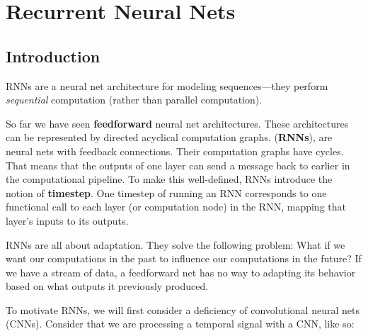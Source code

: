 
\chapter{Recurrent Neural Nets}
\label{chapter:recurrent_neural_nets}

\section{Introduction}
RNNs are a neural net architecture for modeling sequences—they perform \textit{sequential} computation (rather than parallel computation). 

So far we have seen {\bf feedforward} neural net architectures. These architectures can be represented by directed acyclical computation graphs.  ({\bf RNNs}), are neural nets with feedback connections. Their computation graphs have cycles. That means that the outputs of one layer can send a message back to earlier in the computational pipeline. To make this well-defined, RNNs introduce the notion of \textbf{timestep}. One timestep of running an RNN corresponds to one functional call to each layer (or computation node) in the RNN, mapping that layer's inputs to its outputs.

RNNs are all about adaptation. They solve the following problem: What if we want our computations in the past to influence our computations in the future? If we have a stream of data, a feedforward net has no way to adapting its behavior based on what outputs it previously produced.

To motivate RNNs, we will first consider a deficiency of convolutional neural nets (CNNs). Consider that we are processing a temporal signal with a CNN, like so:

